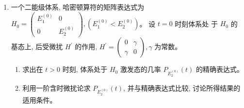 \begin{enumerate}



\item 
一个二能级体系, 哈密顿算符的矩阵表达式为 $H_{0}=\left(\begin{array}{cc}E_{1}^{(0)} & 0 \\ 0 & E_{2}^{(0)}\end{array}\right),\left(E_{1}^{(0)}<E_{2}^{(0)}\right) $。 设 $t=0$ 时刻体系处
于 $H_{0}$ 的基态上, 后受微扰 $H^{\prime}$ 的作用, $H^{\prime}=\left(\begin{array}{cc}0 & \gamma \\ \gamma & 0\end{array}\right), \gamma$ 为常数。
\begin{enumerate}
	\item
	求出在 $t>0$ 时刻, 体系处于 $H_{0}$ 激发态的几率 $P_{E_{2}^{(0)}}(t)$ 的精确表达式。
	\item 
	利用一阶含时微扰论求 $P_{E_{2}^{(0)}}(t)$, 并与精确表达式比较, 讨论所得结果的适用条件。
	
	
	
\end{enumerate}



\end{enumerate}
